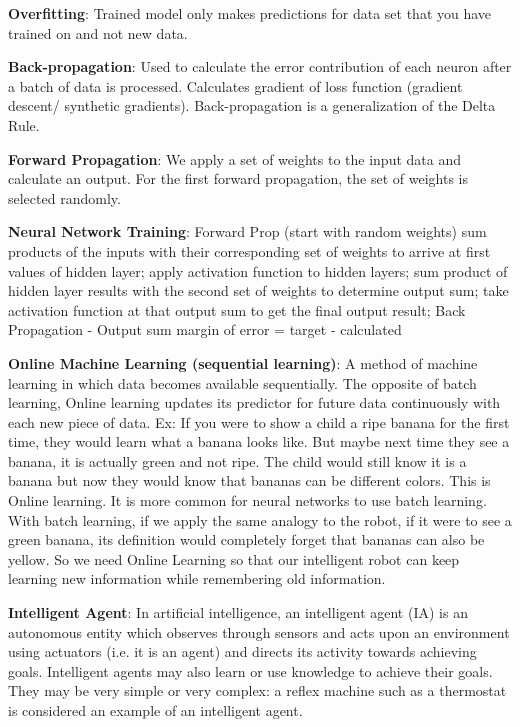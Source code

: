 \documentclass[draftclsnofoot, onecolumn, 10pt, compsoc]{IEEEtran}
\begin{document}
\noindent\textbf{Overfitting}: Trained model only makes predictions for data set that you have trained on and not new data.

\noindent\textbf{Back-propagation}: Used to calculate the error contribution of each neuron after a batch of data is processed. Calculates gradient of loss function (gradient descent/ synthetic gradients). Back-propagation is a generalization of the Delta Rule.

\noindent\textbf{Forward Propagation}: We apply a set of weights to the input data and calculate an output. For the first forward propagation, the set of weights is selected randomly.

\noindent\textbf{Neural Network Training}: Forward Prop (start with random weights) sum products of the inputs with their corresponding set of weights to arrive at first values of hidden layer; apply activation function to hidden layers; sum product of hidden layer results with the second set of weights to determine output sum; take activation function at that output sum to get the final output result; Back Propagation \cite{neuralnets} \newline
		- Output sum margin of error = target - calculated

\noindent\textbf{Online Machine Learning (sequential learning)}: A method of machine learning in which data becomes available sequentially. The opposite of batch learning, Online learning updates its predictor for future data continuously with each new piece of data. Ex: If you were to show a child a ripe banana for the first time, they would learn what a banana looks like. But maybe next time they see a banana, it is actually green and not ripe. The child would still know it is a banana but now they would know that bananas can be different colors. This is Online learning. It is more common for neural networks to use batch learning. With batch learning, if we apply the same analogy to the robot, if it were to see a green banana, its definition would completely forget that bananas can also be yellow. So we need Online Learning so that our intelligent robot can keep learning new information while remembering old information.

\noindent\textbf{Intelligent Agent}: In artificial intelligence, an intelligent agent (IA) is an autonomous entity which observes through sensors and acts upon an environment using actuators (i.e. it is an agent) and directs its activity towards achieving goals. Intelligent agents may also learn or use knowledge to achieve their goals. They may be very simple or very complex: a reflex machine such as a thermostat is considered an example of an intelligent agent.
\cite{Norvig}
\end{document}
